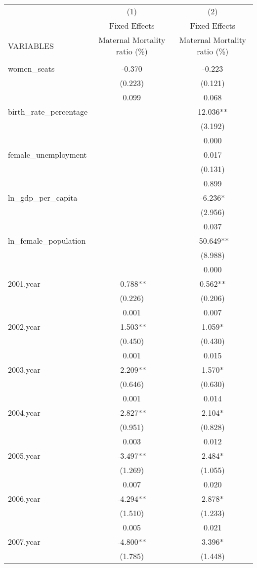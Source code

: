 \begin{tabular}{lcc} \hline
 & (1) & (2) \\
 & Fixed Effects & Fixed Effects \\
VARIABLES & Maternal Mortality ratio (\%) & Maternal Mortality ratio (\%) \\ \hline
 &  &  \\
women\_seats & -0.370 & -0.223 \\
 & (0.223) & (0.121) \\
 & 0.099 & 0.068 \\
birth\_rate\_percentage &  & 12.036** \\
 &  & (3.192) \\
 &  & 0.000 \\
female\_unemployment &  & 0.017 \\
 &  & (0.131) \\
 &  & 0.899 \\
ln\_gdp\_per\_capita &  & -6.236* \\
 &  & (2.956) \\
 &  & 0.037 \\
ln\_female\_population &  & -50.649** \\
 &  & (8.988) \\
 &  & 0.000 \\
2001.year & -0.788** & 0.562** \\
 & (0.226) & (0.206) \\
 & 0.001 & 0.007 \\
2002.year & -1.503** & 1.059* \\
 & (0.450) & (0.430) \\
 & 0.001 & 0.015 \\
2003.year & -2.209** & 1.570* \\
 & (0.646) & (0.630) \\
 & 0.001 & 0.014 \\
2004.year & -2.827** & 2.104* \\
 & (0.951) & (0.828) \\
 & 0.003 & 0.012 \\
2005.year & -3.497** & 2.484* \\
 & (1.269) & (1.055) \\
 & 0.007 & 0.020 \\
2006.year & -4.294** & 2.878* \\
 & (1.510) & (1.233) \\
 & 0.005 & 0.021 \\
2007.year & -4.800** & 3.396* \\
 & (1.785) & (1.448) \\

\end{tabular}
